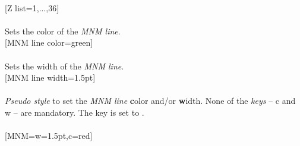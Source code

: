 \\ [10pt][Z list={1,...,36}]%
\\ [10pt]\makebox[\linewidth][c]{\scalebox{.6}{\pgfPT[Z list={1,...,36}]}}%
\\ [0pt]\pgfPTendoption%
\label{option_MNM line color}%
%
{Sets the color of the \textit{MNM line}.}%
\\ [5pt][MNM line color=green]%
\\ [10pt]\makebox[\linewidth][c]{\scalebox{.6}{\pgfPT[MNM line color=green]}}%
\\ [0pt]\pgfPTendoption%
\label{option_MNM line width}%
%
{Sets the width of the \textit{MNM line}.}%
\\ [5pt][MNM line width=1.5pt]%
\\ [10pt]\makebox[\linewidth][c]{\scalebox{.6}{\pgfPT[MNM line width=1.5pt]}}%
\\ [0pt]\pgfPTendoption%
\label{style_MNM}%
%
{\textit{Pseudo style} to set the \textit{MNM line} \textbf{c}olor and/or \textbf{w}idth. None of the \textit{keys} -- c and w -- are mandatory. The key  is set to .
\\ [3pt]%
}%
\\ [5pt][MNM={w=1.5pt,c=red}]%
\\ [10pt]\makebox[\linewidth][c]{\scalebox{.6}{\pgfPT[MNM={w=1.5pt,c=red}]}}%
\\ [0pt]\pgfPTendstyle%
\endinput%
